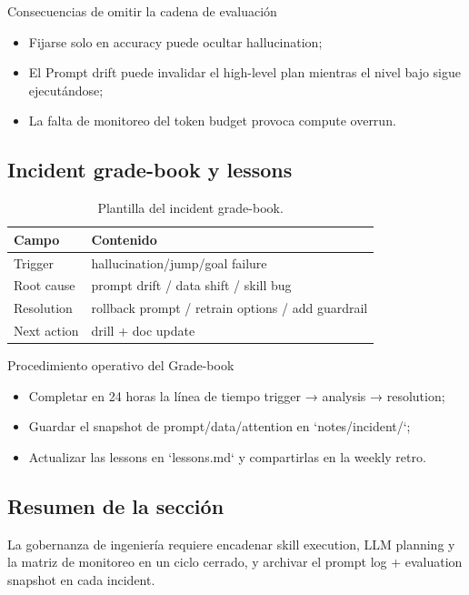 \begin{warningbox}{Consecuencias de omitir la cadena de evaluación}
\begin{itemize}
    \item Fijarse solo en accuracy puede ocultar hallucination;
    \item El Prompt drift puede invalidar el high-level plan mientras el nivel bajo sigue ejecutándose;
    \item La falta de monitoreo del token budget provoca compute overrun.
\end{itemize}
\end{warningbox}

\subsection{Incident grade-book y lessons}

\begin{table}[H]
\centering
\begin{tabular}{p{4cm}p{6cm}}
\toprule
Campo & Contenido \\
\midrule
Trigger & hallucination/jump/goal failure \\
Root cause & prompt drift / data shift / skill bug \\
Resolution & rollback prompt / retrain options / add guardrail \\
Next action & drill + doc update \\
\bottomrule
\end{tabular}
\caption{Plantilla del incident grade-book.}
\end{table}

\begin{importantbox}{Procedimiento operativo del Grade-book}
\begin{itemize}
    \item Completar en 24 horas la línea de tiempo trigger → analysis → resolution;
    \item Guardar el snapshot de prompt/data/attention en `notes/incident/`;
    \item Actualizar las lessons en `lessons.md` y compartirlas en la weekly retro.
\end{itemize}
\end{importantbox}

\subsection{Resumen de la sección}

La gobernanza de ingeniería requiere encadenar skill execution, LLM planning y la matriz de monitoreo en un ciclo cerrado, y archivar el prompt log + evaluation snapshot en cada incident.
